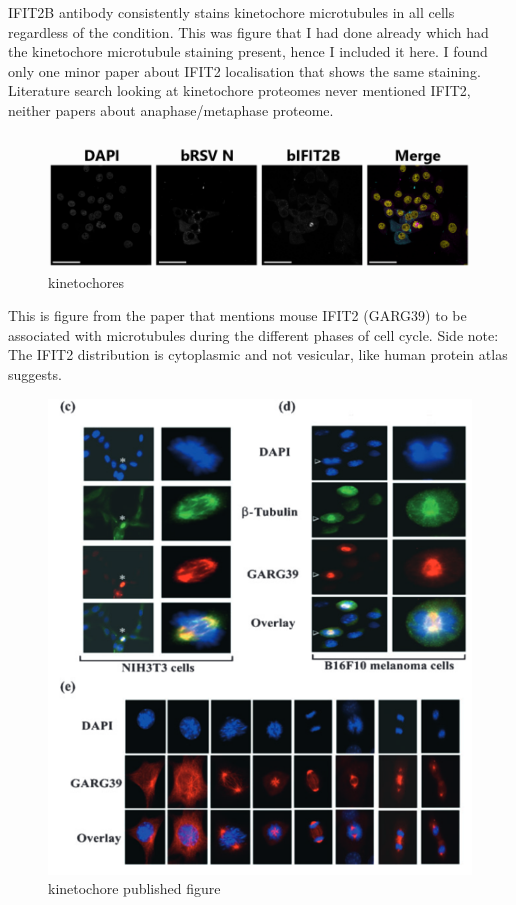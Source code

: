 IFIT2B antibody consistently stains kinetochore microtubules in all cells regardless of the condition. This was figure that I had done already which had the kinetochore microtubule staining present, hence I included it here. I found only one minor paper about IFIT2 localisation that shows the same staining. Literature search looking at kinetochore proteomes never mentioned IFIT2, neither papers about anaphase/metaphase proteome.

\begin{figure}
    \centering
    \includegraphics[width=1\linewidth]{10. Chapter 5/Figs/05. IFIT2AB Discussion/03. kinetochores.png}
    \caption[kinetochores]{kinetochores}
    \label{fig:kinetochores}
\end{figure}

This is figure from the paper that mentions mouse IFIT2 (GARG39) to be associated with microtubules during the different phases of cell cycle.
Side note: The IFIT2 distribution is cytoplasmic and not vesicular, like human protein atlas suggests.

\begin{figure}
    \centering
    \includegraphics[width=1\linewidth]{10. Chapter 5/Figs/05. IFIT2AB Discussion/04. kinetochore published figure.png}
    \caption[kinetochore published figure]{kinetochore published figure}
    \label{fig:kinetochore published figure}
\end{figure}

